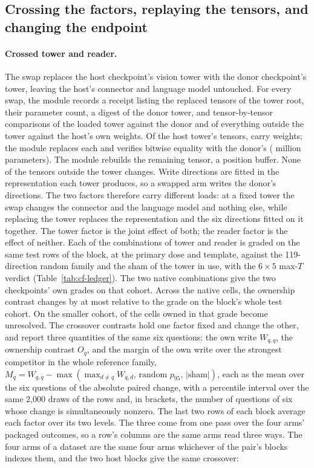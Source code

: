 \subsection{Crossing the factors, replaying the tensors, and changing the endpoint}
\label{app:cf-crossed}

\paragraph{Crossed tower and reader.} The swap replaces the host checkpoint's vision tower with the donor checkpoint's tower, leaving the host's connector and language model untouched. For every swap, the module records a receipt listing the replaced tensors of the tower root, their parameter count, a digest of the donor tower, and tensor-by-tensor comparisons of the loaded tower against the donor and of everything outside the tower against the host's own weights. Of the host tower's \cfSwapTowerTensors{} tensors, \cfSwapTensors{} carry weights; the module replaces each and verifies bitwise equality with the donor's (\cfSwapParamsM{} million parameters). The module rebuilds the remaining tensor, a position buffer. None of the \cfSwapOutside{} tensors outside the tower changes. Write directions are fitted in the representation each tower produces, so a swapped arm writes the donor's directions. The two factors therefore carry different loads: at a fixed tower the swap changes the connector and the language model and nothing else, while replacing the tower replaces the representation and the six directions fitted on it together. The tower factor is the joint effect of both; the reader factor is the effect of neither. Each of the \cfSwapCombos{} combinations of tower and reader is graded on the same \cfSwapRows{} test rows of the block, at the primary dose and template, against the 119-direction random family and the sham of the tower in use, with the $6\times5$ max-$T$ verdict (Table~\ref{tab:cf-ledger}). The two native combinations give the two checkpoints' own grades on that cohort. Across the \cfSwapNativeCells{} native cells, the ownership contrast changes by at most \cfSwapNativeMaxDO{} relative to the grade on the block's whole test cohort. On the smaller cohort, \cfSwapNativeUnresolved{} of the \cfSwapNativeOwnedFull{} cells owned in that grade become unresolved. The crossover contrasts hold one factor fixed and change the other, and report three quantities of the same six questions: the own write $W_{q,q}$, the ownership contrast $O_q$, and the margin of the own write over the strongest competitor in the whole reference family, $M_q=W_{q,q}-\max(\max_{d\neq q}W_{q,d},\,\text{random }p_{95},\,|\text{sham}|)$, each as the mean over the six questions of the absolute paired change, with a percentile interval over the same 2{,}000 draws of the rows and, in brackets, the number of questions of six whose change is simultaneously nonzero. The last two rows of each block average each factor over its two levels. The three come from one pass over the four arms' packaged outcomes, so a row's columns are the same arms read three ways. The four arms of a dataset are the same four arms whichever of the pair's blocks indexes them, and the two host blocks give the same crossover: 